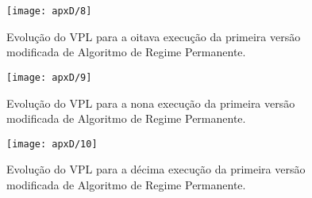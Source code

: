\begin{figure}[H]
\centering
\texttt{[image: apxD/8]}
\caption{Evolução do VPL para a oitava execução da primeira versão modificada de Algoritmo de Regime Permanente.}
\label{fig:graphRPM-08}
\end{figure}

\begin{figure}[H]
\centering
\texttt{[image: apxD/9]}
\caption{Evolução do VPL para a nona execução da primeira versão modificada de Algoritmo de Regime Permanente.}
\label{fig:graphRPM-09}
\end{figure}

\begin{figure}[H]
\centering
\texttt{[image: apxD/10]}
\caption{Evolução do VPL para a décima execução da primeira versão modificada de Algoritmo de Regime Permanente.}
\label{fig:graphRPM-10}
\end{figure}
